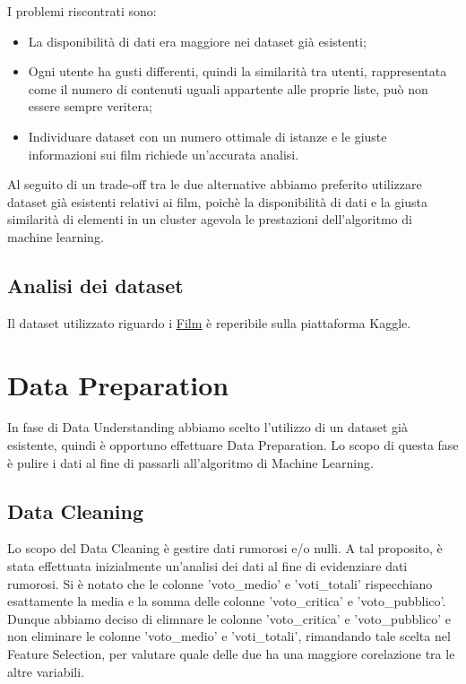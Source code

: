 \documentclass[a4paper, 12pt]{report}
\begin{document}
            I problemi riscontrati sono:
            \begin{itemize}
                \item La disponibilità di dati era maggiore nei dataset già esistenti;
                \item Ogni utente ha gusti differenti, quindi la similarità tra utenti, rappresentata come il numero di contenuti uguali
                      appartente alle proprie liste, può non essere sempre veritera;
                \item Individuare dataset con un numero ottimale di istanze e le giuste informazioni sui film richiede
                      un'accurata analisi.
            \end{itemize}
            Al seguito di un trade-off tra le due alternative abbiamo preferito utilizzare dataset già esistenti relativi ai film,
            poichè la disponibilità di dati e la giusta similarità di elementi in un cluster agevola le prestazioni dell'algoritmo
            di machine learning.

        \section{Analisi dei dataset}\label{sec:analisi-dei-dataset}
            Il dataset utilizzato riguardo i \href{https://www.kaggle.com/datasets/stefanoleone992/filmtv-movies-dataset?resource=download}{\underline{Film}}
            è reperibile sulla piattaforma Kaggle.


    \chapter{Data Preparation}\label{ch:data-preparation}
        In fase di Data Understanding abbiamo scelto l'utilizzo di un dataset già esistente, quindi è opportuno effettuare Data Preparation.
        Lo scopo di questa fase è pulire i dati al fine di passarli all'algoritmo di Machine Learning.

        \section{Data Cleaning}\label{sec:data-cleaning}
            Lo scopo del Data Cleaning è gestire dati rumorosi e/o nulli.
            A tal proposito, è stata effettuata inizialmente un'analisi dei dati al fine di evidenziare dati rumorosi.
            Si è notato che le colonne 'voto\_medio' e 'voti\_totali' rispecchiano esattamente la media e la somma delle colonne
            'voto\_critica' e 'voto\_pubblico'. Dunque abbiamo deciso di elimnare le colonne 'voto\_critica' e 'voto\_pubblico' e
            non eliminare le colonne 'voto\_medio' e 'voti\_totali', rimandando tale scelta nel Feature Selection, per valutare
            quale delle due ha una maggiore corelazione tra le altre variabili.
\end{document}
